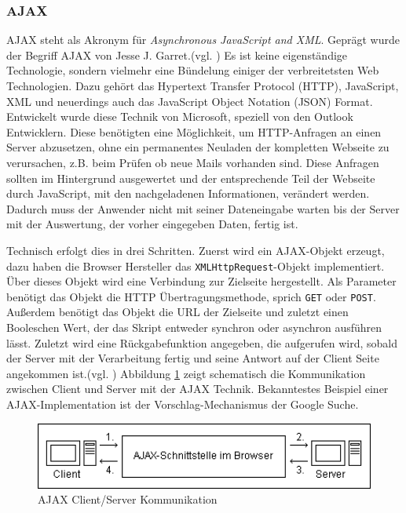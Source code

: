 \subsubsection{AJAX}
AJAX steht als Akronym für \textit{Asynchronous JavaScript and XML}. Geprägt wurde der Begriff AJAX von Jesse J. Garret.(vgl. \cite{JesseJGarret}) Es ist keine eigenständige Technologie, sondern vielmehr eine Bündelung einiger der verbreitetsten Web Technologien. Dazu gehört das Hypertext Transfer Protocol (HTTP), JavaScript, XML und neuerdings auch das JavaScript Object Notation (JSON) Format. Entwickelt wurde diese Technik von Microsoft, speziell von den Outlook Entwicklern. Diese benötigten eine Möglichkeit, um HTTP-Anfragen an einen Server abzusetzen, ohne ein permanentes Neuladen der kompletten Webseite zu verursachen, z.B. beim Prüfen ob neue Mails vorhanden sind. Diese Anfragen sollten im Hintergrund ausgewertet und der entsprechende Teil der Webseite durch JavaScript, mit den nachgeladenen Informationen, verändert werden. Dadurch muss der Anwender nicht mit seiner Dateneingabe warten bis der Server mit der Auswertung, der vorher eingegeben Daten, fertig ist.\par Technisch erfolgt dies in drei Schritten. Zuerst wird ein AJAX-Objekt erzeugt, dazu haben die Browser Hersteller das \texttt{XMLHttpRequest}-Objekt implementiert. Über dieses Objekt wird eine Verbindung zur Zielseite hergestellt. Als Parameter benötigt das Objekt die HTTP Übertragungsmethode, sprich \texttt{GET} oder \texttt{POST}. Außerdem benötigt das Objekt die URL der Zielseite und zuletzt einen Booleschen Wert, der das Skript entweder synchron oder asynchron ausführen lässt. Zuletzt wird eine Rückgabefunktion angegeben, die aufgerufen wird, sobald der Server mit der Verarbeitung fertig und seine Antwort auf der Client Seite angekommen ist.(vgl. \cite[S.392ff]{WenzJava2008}) Abbildung \ref{fig:ajax} zeigt schematisch die Kommunikation zwischen Client und Server mit der AJAX Technik. Bekanntestes Beispiel einer AJAX-Implementation ist der Vorschlag-Mechanismus der Google Suche.

\vspace{1em}
\begin{figure}[htb]
  \centering
  \includegraphics[width=1\textwidth]{abb/ajax_uml}
  \caption[AJAX Client/Server Kommunikation]{AJAX Client/Server Kommunikation \cite{ajax}}
  \label{fig:ajax}
\end{figure}

